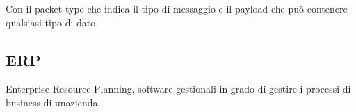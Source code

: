 \documentclass[
]{article}
\begin{document}
{Con il packet type che indica il tipo di messaggio e il payload che può
contenere qualsiasi tipo di dato.}

{}

\subsection{\texorpdfstring{{ERP}}{ERP}}\label{h.sm3u5seh16b0}

{Enterprise Resource Planning, software gestionali in grado di gestire i
processi di business di un\textquotesingle azienda.}
\end{document}

